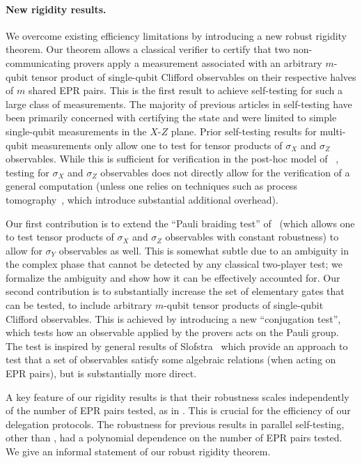 \documentclass[11pt]{article}
\numberwithin{equation}{section}
\theoremstyle{definition}
\theoremstyle{plain}
\begin{document}
\paragraph{New rigidity results.} 
We overcome existing efficiency limitations by introducing a new robust rigidity theorem. Our theorem allows a classical verifier to certify that two non-communicating provers apply a measurement associated with an arbitrary $m$-qubit tensor product of single-qubit Clifford observables on their respective halves of $m$ shared EPR pairs.
This is the first result to achieve self-testing for such a large class of
measurements. The majority of previous %
articles  %
in self-testing have been primarily
concerned with certifying the state and were limited to simple single-qubit
measurements in the $X$-$Z$ plane. Prior self-testing results for multi-qubit
measurements only allow one to test for tensor products of $\sigma_X$ and $\sigma_Z$
observables. While this is sufficient for verification in the post-hoc model
of~\cite{hajdusek2015posthoc-updated, FHM18}%
, testing for $\sigma_X$ and $\sigma_Z$ observables
does not directly allow for the verification of a general computation (unless
one relies on techniques such as process
tomography~\cite{reichardt2012classical}, which introduce substantial additional
overhead).  

Our first contribution is to extend the ``Pauli braiding test'' of~\cite{natarajan2016robust} (which allows one to test tensor products of $\sigma_X$ and $\sigma_Z$ observables with constant robustness) to allow for $\sigma_Y$ observables as well. This is somewhat subtle due to an ambiguity in the complex phase that cannot be detected by any classical two-player test; we formalize the ambiguity and show how it can be effectively accounted for. Our second contribution is to substantially increase the set of elementary gates that can be tested, to include arbitrary $m$-qubit tensor products of single-qubit Clifford observables. This is achieved by introducing a new ``conjugation test'', which tests how an observable applied by the provers acts on the Pauli group. The test is inspired by general results of Slofstra~\cite{slofstra2016tsirelson} which provide an approach to test that a set of observables satisfy some algebraic relations (when acting on EPR pairs), but is substantially more direct. 

 A key feature of our rigidity results is that their robustness scales independently of the number of EPR pairs tested, as in \cite{natarajan2016robust}. This is crucial for the efficiency of our delegation protocols. The robustness for previous results in parallel self-testing, other than \cite{natarajan2016robust}, had a polynomial dependence on the number of EPR pairs tested. We give an informal statement of our robust rigidity theorem.
 
\end{document}
